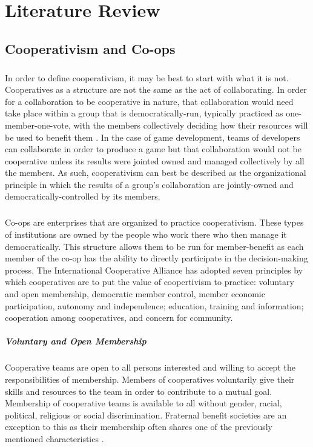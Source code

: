 \chapter{Literature Review}

\section{Cooperativism and Co-ops}

\paragraph{} In order to define cooperativism, it may be best to start with what it is not. Cooperatives as a structure are not the same as the act of collaborating. In order for a collaboration to be cooperative in nature, that collaboration would need take place within a group that is democratically-run, typically practiced as one-member-one-vote, with the members collectively deciding how their resources will be used to benefit them \autocite[54]{ratner_cooperativism_2009}. In the case of game development, teams of developers can collaborate in order to produce a game but that collaboration would not be cooperative unless its results were jointed owned and managed collectively by all the members. As such, cooperativism can best be described as the organizational principle in which the results of a group's collaboration are jointly-owned and democratically-controlled by its members.

\paragraph{} Co-ops are enterprises that are organized to practice cooperativism. These types of institutions are owned by the people who work there who then manage it democratically. This structure allows them to be run for member-benefit as each member of the co-op has the ability to directly participate in the decision-making process. The International Cooperative Alliance has adopted seven principles by which cooperatives are to put the value of coopertivism to practice: voluntary and open membership, democratic member control, member economic participation, autonomy and independence; education, training and information; cooperation among cooperatives, and concern for community\nocite{international_cooperative_alliance_cooperative_nodate}.

\paragraph{Voluntary and Open Membership} Cooperative teams are open to all persons interested and willing to accept the responsibilities of membership. Members of cooperatives voluntarily give their skills and resources to the team in order to contribute to a mutual goal. Membership of cooperative teams is available to all without gender, racial, political, religious or social discrimination. Fraternal benefit societies are an exception to this as their membership often shares one of the previously mentioned characteristics \autocite[16]{boland_introduction_2017}.

